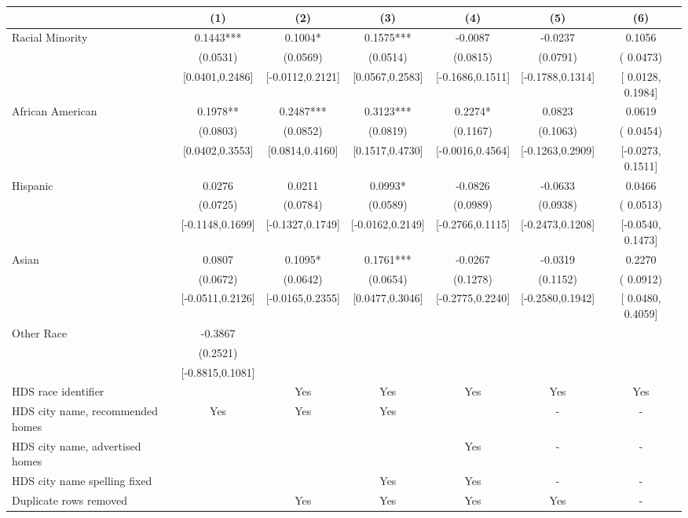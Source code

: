 \begin{table}[htbp]
{\begin{tabular}{l*{6}{c}}
                    \cmidrule(lr){2-2}\cmidrule(lr){3-3}\cmidrule(lr){4-4}\cmidrule(lr){5-5}\cmidrule(lr){6-6}\cmidrule(lr){7-7}
                    &\multicolumn{1}{c}{(1)}   &\multicolumn{1}{c}{(2)}   &\multicolumn{1}{c}{(3)}   &\multicolumn{1}{c}{(4)}   &\multicolumn{1}{c}{(5)}   &\multicolumn{1}{c}{(6)}\\
\midrule
Racial Minority & 0.1443*** & 0.1004* & 0.1575*** & -0.0087 & -0.0237 & 0.1056\sym{**} \\
 & (0.0531) & (0.0569) & (0.0514) & (0.0815) & (0.0791) & ( 0.0473) \\
 & [0.0401,0.2486] & [-0.0112,0.2121] & [0.0567,0.2583] & [-0.1686,0.1511] & [-0.1788,0.1314] & [ 0.0128,  0.1984] \\
\midrule
African American & 0.1978** & 0.2487*** & 0.3123*** & 0.2274* & 0.0823 & 0.0619 \\
 & (0.0803) & (0.0852) & (0.0819) & (0.1167) & (0.1063) & ( 0.0454) \\
 & [0.0402,0.3553] & [0.0814,0.4160] & [0.1517,0.4730] & [-0.0016,0.4564] & [-0.1263,0.2909] & [-0.0273,  0.1511] \\
Hispanic & 0.0276 & 0.0211 & 0.0993* & -0.0826 & -0.0633 & 0.0466 \\
 & (0.0725) & (0.0784) & (0.0589) & (0.0989) & (0.0938) & ( 0.0513) \\
 & [-0.1148,0.1699] & [-0.1327,0.1749] & [-0.0162,0.2149] & [-0.2766,0.1115] & [-0.2473,0.1208] & [-0.0540,  0.1473] \\
Asian & 0.0807 & 0.1095* & 0.1761*** & -0.0267 & -0.0319 & 0.2270\sym{**} \\
 & (0.0672) & (0.0642) & (0.0654) & (0.1278) & (0.1152) & ( 0.0912) \\
 & [-0.0511,0.2126] & [-0.0165,0.2355] & [0.0477,0.3046] & [-0.2775,0.2240] & [-0.2580,0.1942] & [ 0.0480,  0.4059] \\
Other Race & -0.3867 &  &  &  &  &  \\
 & (0.2521) &  &  &  &  &  \\
 & [-0.8815,0.1081] &  &  &  &  &  \\
\midrule
HDS race identifier & & Yes & Yes & Yes & Yes & Yes \\
HDS city name, recommended homes & Yes & Yes & Yes & & - & -\\
HDS city name, advertised homes &  &  &  & Yes & - & -\\
HDS city name spelling fixed & & & Yes & Yes & - & -\\
Duplicate rows removed &  & Yes & Yes & Yes & Yes & - \\

\end{tabular}}
\end{table}
